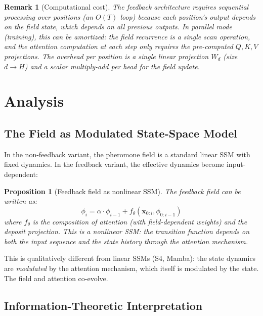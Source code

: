 \documentclass[11pt,a4paper]{article}
\newtheorem{proposition}{Proposition}
\newtheorem{remark}{Remark}
\newcommand{\retain}{\alpha}
\newcommand{\x}{\bm{x}}
\begin{document}
\begin{remark}[Computational cost]
The feedback architecture requires sequential processing over positions
(an $O(T)$ loop) because each position's output depends on the field
state, which depends on all previous outputs. In parallel mode
(training), this can be amortized: the field recurrence is a single
scan operation, and the attention computation at each step only
requires the pre-computed $Q, K, V$ projections. The overhead per
position is a single linear projection $W_d$ (size $d \to H$) and
a scalar multiply-add per head for the field update.
\end{remark}


\section{Analysis}
\label{sec:analysis}

\subsection{The Field as Modulated State-Space Model}

In the non-feedback variant, the pheromone field is a standard linear
SSM with fixed dynamics. In the feedback variant, the effective dynamics
become input-dependent:

\begin{proposition}[Feedback field as nonlinear SSM]
\label{prop:nonlinear}
The feedback field can be written as:
\begin{equation}
    \phi_i = \retain \cdot \phi_{i-1} + f_\theta(\x_{0:i}, \phi_{0:i-1})
\end{equation}
where $f_\theta$ is the composition of attention (with field-dependent
weights) and the deposit projection. This is a nonlinear SSM: the
transition function depends on both the input sequence and the state
history through the attention mechanism.
\end{proposition}

This is qualitatively different from linear SSMs (S4, Mamba): the
state dynamics are \emph{modulated} by the attention mechanism, which
itself is modulated by the state. The field and attention co-evolve.

\subsection{Information-Theoretic Interpretation}
\end{document}
